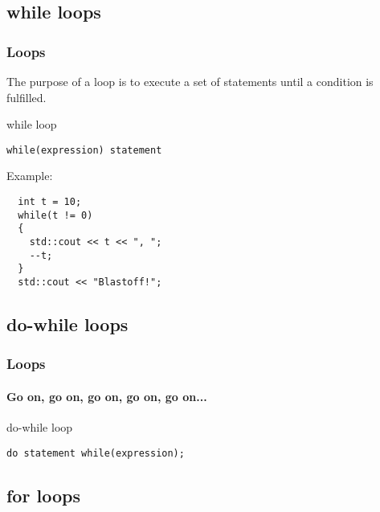 \documentclass{beamer}
\begin{document}
\subsection{while loops}

\begin{frame}[fragile]
  \frametitle{Loops}
  The purpose of a loop is to execute a set of statements until a condition is fulfilled.
  \begin{block}{while loop}
    \begin{lstlisting}
while(expression) statement
    \end{lstlisting}
    Example:
  \begin{lstlisting}
  int t = 10;
  while(t != 0)
  {
    std::cout << t << ", ";
    --t;  
  }
  std::cout << "Blastoff!";
  \end{lstlisting}
  \end{block}
\end{frame}

\subsection{do-while loops}

\begin{frame}[fragile]
  \frametitle{Loops}
  \framesubtitle{Go on, go on, go on, go on, go on...}
  
  \begin{block}{do-while loop}
    \begin{lstlisting}
do statement while(expression);
    \end{lstlisting}
    
  \end{block}
\end{frame}

\subsection{for loops}
\end{document}
